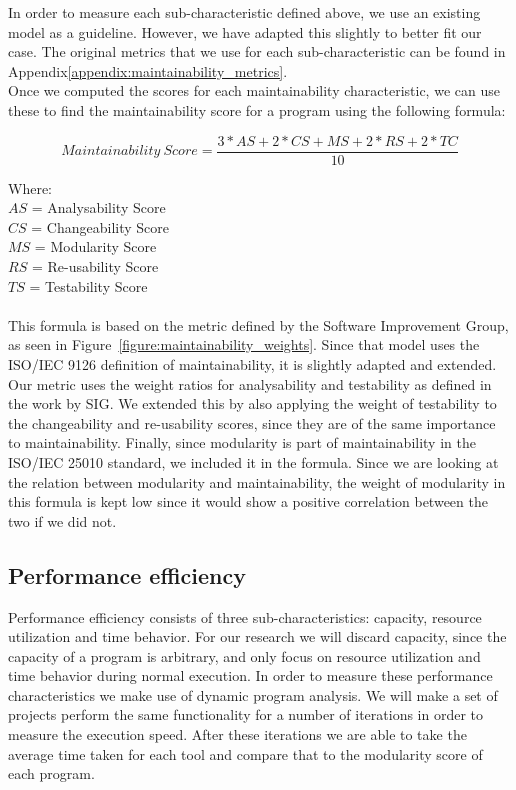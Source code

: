 \documentclass[twoside]{uva-inf-bachelor-thesis}
\begin{document}
In order to measure each sub-characteristic defined above, we use an existing model\cite{heitlager2016practical} as a guideline. However, we have adapted this slightly to better fit our case. The original metrics that we use for each sub-characteristic can be found in Appendix\ref{appendix:maintainability_metrics}.\\

Once we computed the scores for each maintainability characteristic, we can use these to find the maintainability score for a program using the following formula:

\[ Maintainability\ Score = \dfrac{3 * AS + 2 * CS + MS + 2 * RS + 2 * TC}{10} \]

Where:\\
$AS$ = Analysability Score\\
$CS$ = Changeability Score\\
$MS$ = Modularity Score\\
$RS$ = Re-usability Score\\
$TS$ = Testability Score\\
\\
This formula is based on the metric defined by the Software Improvement Group, as seen in Figure~\ref{figure:maintainability_weights}. Since that model uses the ISO/IEC 9126 definition of maintainability, it is slightly adapted and extended. Our metric uses the weight ratios for analysability and testability as defined in the work by SIG. We extended this by also applying the weight of testability to the changeability and re-usability scores, since they are of the same importance to maintainability. Finally, since modularity is part of maintainability in the ISO/IEC 25010 standard, we included it in the formula. Since we are looking at the relation between modularity and maintainability, the weight of modularity in this formula is kept low since it would show a positive correlation between the two if we did not.

\subsection{Performance efficiency}
\label{method:performance}
Performance efficiency consists of three sub-characteristics: capacity, resource utilization and time behavior. For our research we will discard capacity, since the capacity of a program is arbitrary, and only focus on resource utilization and time behavior during normal execution. In order to measure these performance characteristics we make use of dynamic program analysis. We will make a set of projects perform the same functionality for a number of iterations in order to measure the execution speed. After these iterations we are able to take the average time taken for each tool and compare that to the modularity score of each program.\\
\end{document}
